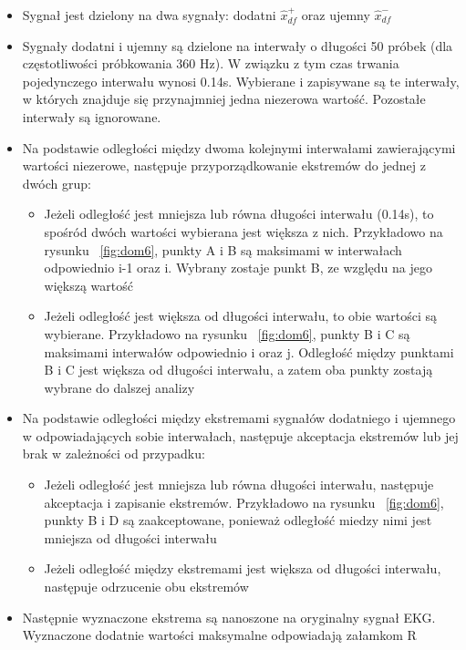 \documentclass[10pt,a4paper]{article}
\begin{document}
\begin{itemize}
	\item 	Sygnał jest dzielony na dwa sygnały: dodatni $\hat{x}_{df}^+$ oraz ujemny $\hat{x}_{df}^-$
	\item Sygnały dodatni i ujemny są dzielone na interwały o długości 50 próbek (dla częstotliwości próbkowania 360 Hz). W związku z tym czas trwania pojedynczego interwału wynosi 0.14s. Wybierane i zapisywane są te interwały, w których znajduje się przynajmniej jedna niezerowa wartość. Pozostałe interwały są ignorowane.
	\item Na podstawie odległości między dwoma kolejnymi interwałami zawierającymi wartości niezerowe, następuje przyporządkowanie ekstremów do jednej z dwóch grup:

	\begin{itemize}
		
	\item Jeżeli odległość jest mniejsza lub równa długości interwału (0.14s), to spośród dwóch wartości wybierana jest większa z nich. Przykładowo na rysunku ~\ref{fig:dom6}, punkty A i B są maksimami w interwałach odpowiednio  i-1 oraz i. Wybrany zostaje punkt B, ze względu na jego większą wartość
	\item Jeżeli odległość jest większa od długości interwału, to obie wartości są wybierane. Przykładowo na rysunku ~\ref{fig:dom6}, punkty B i C są maksimami interwałów odpowiednio i oraz j. Odległość między punktami B i C jest większa od długości interwału, a zatem oba punkty zostają wybrane do dalszej analizy
		
	\end{itemize}
	\item Na podstawie odległości między ekstremami sygnałów dodatniego i ujemnego w odpowiadających sobie interwałach, następuje akceptacja ekstremów lub jej brak w zależności od przypadku:
	\begin{itemize}
	\item Jeżeli odległość jest mniejsza lub równa długości interwału, następuje akceptacja i zapisanie ekstremów. Przykładowo na rysunku ~\ref{fig:dom6}, punkty B i D są zaakceptowane, ponieważ odległość miedzy nimi jest mniejsza od długości interwału
	\item Jeżeli odległość między ekstremami jest większa od długości interwału, następuje odrzucenie obu ekstremów
	\end{itemize}
	\item Następnie wyznaczone ekstrema są nanoszone na oryginalny sygnał EKG. Wyznaczone dodatnie wartości maksymalne odpowiadają załamkom R
\end{itemize}
	
\end{document}
